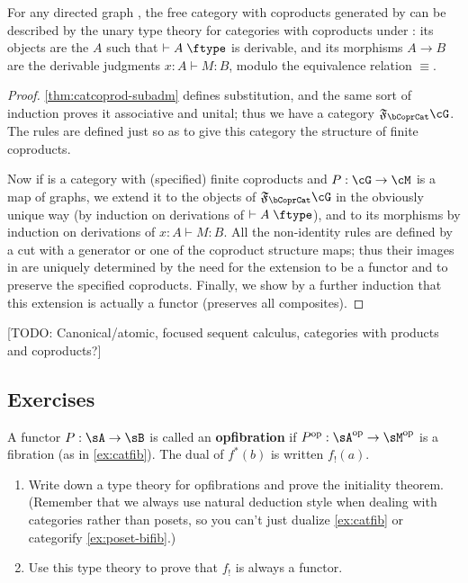 \documentclass{book}
\let\types\vdash
\def\type{\;\ftype}
\newcommand{\F}[1]{\mathfrak{F}_{#1}}
\begin{document}
\begin{thm}\label{thm:catcoprod-initial}
  For any directed graph \cG, the free category with coproducts generated by \cG can be described by the unary type theory for categories with coproducts under \cG: its objects are the $A$ such that $\types A\type$ is derivable, and its morphisms $A\to B$ are the derivable judgments $x:A\types M:B$, modulo the equivalence relation $\equiv$.
\end{thm}
\begin{proof}
  \cref{thm:catcoprod-subadm} defines substitution, and the same sort of induction proves it associative and unital; thus we have a category $\F\bCoprCat\cG$.
  The rules are defined just so as to give this category the structure of finite coproducts.

  Now if \cM is a category with (specified) finite coproducts and $P:\cG\to\cM$ is a map of graphs, we extend it to the objects of $\F\bCoprCat\cG$ in the obviously unique way (by induction on derivations of $\types A\type$), and to its morphisms by induction on derivations of $x:A\types M:B$.
  All the non-identity rules are defined by a cut with a generator or one of the coproduct structure maps; thus their images in \cM are uniquely determined by the need for the extension to be a functor and to preserve the specified coproducts.
  Finally, we show by a further induction that this extension is actually a functor (preserves all composites).
\end{proof}

[TODO: Canonical/atomic, focused sequent calculus, categories with products and coproducts?]


\subsection*{Exercises}

\begin{ex}\label{ex:cat-opfib}
  A functor $P:\sA\to\sB$ is called an \textbf{opfibration} if $P\op:\sA\op\to\sM\op$ is a fibration (as in \cref{ex:catfib}).
  The dual of $f^*(b)$ is written $f_!(a)$.
  \begin{enumerate}
  \item Write down a type theory for opfibrations and prove the initiality theorem.
    (Remember that we always use natural deduction style when dealing with categories rather than posets, so you can't just dualize \cref{ex:catfib} or categorify \cref{ex:poset-bifib}.)
  \item Use this type theory to prove that $f_!$ is always a functor.
  \end{enumerate}
\end{ex}
\end{document}
